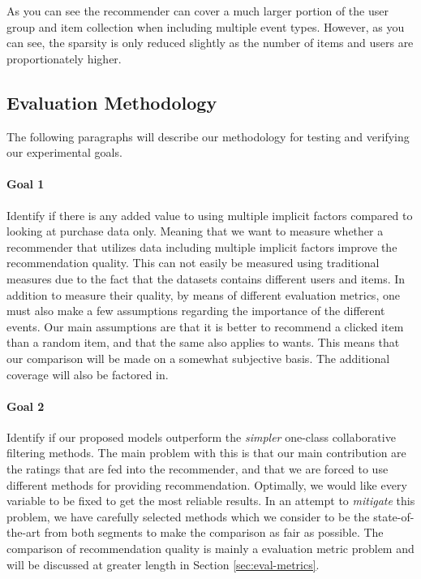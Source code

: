 As you can see the recommender can cover a much larger portion of the user group
and item collection when including multiple event types. However, as you can see, the sparsity is
only reduced slightly as the number of items and users are proportionately higher.

\subsection{Evaluation Methodology}

The following paragraphs will describe our methodology for testing and verifying our experimental
goals.

\paragraph{Goal 1}

Identify if there is any added value to using multiple implicit factors compared to
looking at purchase data only. Meaning that we want to measure whether a recommender that utilizes
data including multiple implicit factors improve the recommendation quality. This can not
easily be measured using traditional measures due to the fact that the datasets contains
different users and items. In addition to measure their quality, by means of different
evaluation metrics, one must also make a few assumptions regarding the importance
of the different events. Our main assumptions are that it is better to recommend a clicked
item than a random item, and that the same also applies to wants. This means that our comparison
will be made on a somewhat subjective basis. The additional coverage will also be factored in. 

\paragraph{Goal 2}

Identify if our proposed models outperform the \emph{simpler} one-class
collaborative filtering methods. The main problem with this is that our main contribution
are the ratings that are fed into the recommender, and that we are forced to use different
methods for providing recommendation. Optimally, we would like every variable to be fixed
to get the most reliable results. In an attempt to \emph{mitigate} this problem, we 
have carefully selected methods which we consider to be the state-of-the-art from both segments
to make the comparison as fair as possible. The comparison of recommendation quality
is mainly a evaluation metric problem and will be discussed at greater length in
Section \ref{sec:eval-metrics}.

